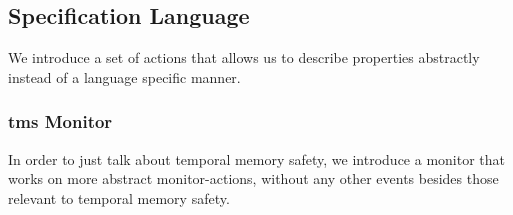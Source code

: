 \documentclass[a4paper,names,dvipsnames]{article}
\begin{document}
\subsection{Specification Language}

We introduce a set of actions that allows us to describe properties abstractly instead of a language specific manner.


\subsubsection{\gls*{tms} Monitor}
In order to just talk about temporal memory safety, we introduce a monitor that works on more abstract monitor-actions, without any other events besides those relevant to temporal memory safety.
\end{document}
